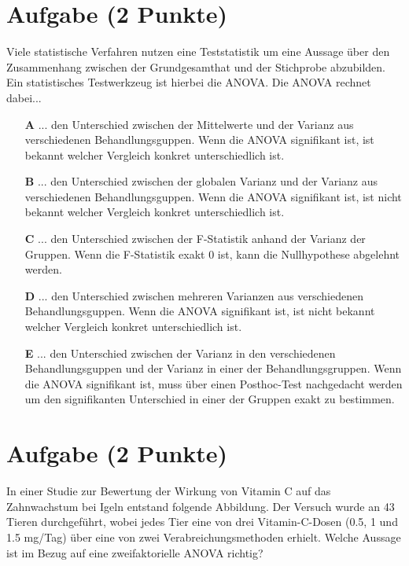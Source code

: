 \documentclass[a4paper, 9pt]{scrartcl}\usepackage[]{graphicx}\usepackage[]{xcolor}
\begin{document}
\section{Aufgabe \hfill (2 Punkte)}




Viele statistische Verfahren nutzen eine Teststatistik um eine Aussage über den Zusammenhang zwischen der Grundgesamthat und der Stichprobe abzubilden. Ein statistisches Testwerkzeug ist hierbei die ANOVA. Die ANOVA rechnet dabei...



\begin{enumerate}
\item [\textbf{A} \msquare] ... den Unterschied zwischen der Mittelwerte und der Varianz aus verschiedenen Behandlungsguppen. Wenn die ANOVA signifikant ist, ist bekannt welcher Vergleich konkret unterschiedlich ist.
\item [\textbf{B} \msquare] ... den Unterschied zwischen der globalen Varianz und der Varianz aus verschiedenen Behandlungsguppen. Wenn die ANOVA signifikant ist, ist nicht bekannt welcher Vergleich konkret unterschiedlich ist.
\item [\textbf{C} \msquare] ... den Unterschied zwischen der F-Statistik anhand der Varianz der Gruppen. Wenn die F-Statistik exakt 0 ist, kann die Nullhypothese abgelehnt werden.
\item [\textbf{D} \msquare] ... den Unterschied zwischen mehreren Varianzen aus verschiedenen Behandlungsguppen. Wenn die ANOVA signifikant ist, ist nicht bekannt welcher Vergleich konkret unterschiedlich ist.
\item [\textbf{E} \msquare] ... den Unterschied zwischen der Varianz in den verschiedenen Behandlungsguppen und der Varianz in einer der Behandlungsgruppen. Wenn die ANOVA signifikant ist, muss über einen Posthoc-Test nachgedacht werden um den signifikanten Unterschied in einer der Gruppen exakt zu bestimmen.
\end{enumerate} 

\section{Aufgabe \hfill (2 Punkte)}



In einer Studie zur Bewertung der Wirkung von Vitamin C auf das Zahnwachstum bei Igeln entstand folgende Abbildung. Der Versuch wurde an 43 Tieren durchgeführt, wobei jedes Tier eine von  drei Vitamin-C-Dosen (0.5, 1 und 1.5 mg/Tag) über eine von zwei Verabreichungsmethoden erhielt. Welche Aussage ist im Bezug auf eine zweifaktorielle ANOVA richtig?
\end{document}
